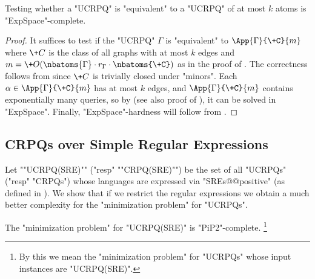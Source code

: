 \begin{corollary}
	\AP\label{coro:upperbound-ucrpqs}
	Testing whether a "UCRPQ" is "equivalent" to a "UCRPQ" of at most $k$ atoms is "ExpSpace"-complete.
\end{corollary}

\begin{proof}
	It suffices to test if the "UCRPQ" $\Gamma$ is "equivalent"
	to $\App{\Gamma}{\+C}{m}$ where $\+C$ is the class of all graphs
	with at most $k$ edges and $m=\+O(\nbatoms{\Gamma}\cdot r_{\Gamma} \cdot \nbatoms{\+C})$ as in the proof of . 
	The correctness follows from  since $\+C$ is
	trivially closed under "minors".
	Each $\alpha \in \App{\Gamma}{\+C}{m}$ has at most $k$ edges,
	and $\App{\Gamma}{\+C}{m}$ contains exponentially many queries,
	so by \cite[Proposition 3.11]{FigueiraMorvan2025SemanticTreeWidthLMCS} (see also proof of ), it can be solved
	in "ExpSpace".
	Finally, "ExpSpace"-hardness will follow from .
\end{proof}

\subsection{CRPQs over Simple Regular Expressions}

\AP Let ""UCRPQ(SRE)"" ("resp" ""CRPQ(SRE)"") be the set of all "UCRPQs" ("resp" "CRPQs") whose languages are expressed via "SREs@@positive" (as defined in ). We show that if we restrict the regular expressions we obtain a much better complexity for the "minimization problem" for "UCRPQs".

\begin{theorem}\AP\label{thm:minimization-SRE}
	The "minimization problem" for "UCRPQ(SRE)" is "PiP2"-complete.%
	\footnote{By this we mean the "minimization problem" for "UCRPQs" whose input instances are "UCRPQ(SRE)".}
\end{theorem}

